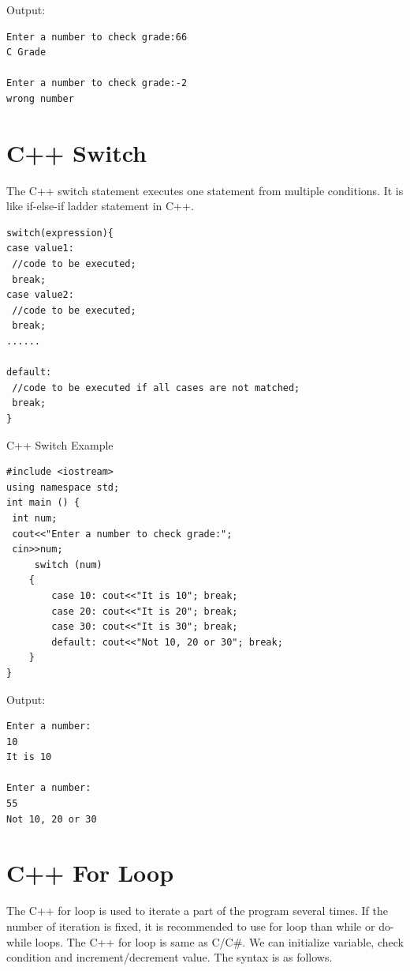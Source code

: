 \documentclass{book}
\begin{document}
Output:

\begin{lstlisting}
Enter a number to check grade:66
C Grade

Enter a number to check grade:-2
wrong number
\end{lstlisting}

\section{C++ Switch}

The C++ switch statement executes one statement from multiple conditions. It is like if-else-if ladder statement in C++.

\begin{lstlisting}
switch(expression){      
case value1:      
 //code to be executed;      
 break;    
case value2:      
 //code to be executed;      
 break;    
......      
      
default:       
 //code to be executed if all cases are not matched;      
 break;    
}    
\end{lstlisting}

C++ Switch Example

\begin{lstlisting}
#include <iostream>  
using namespace std;  
int main () {  
 int num;  
 cout<<"Enter a number to check grade:";    
 cin>>num;  
	 switch (num)    
	{    
		case 10: cout<<"It is 10"; break;    
		case 20: cout<<"It is 20"; break;    
		case 30: cout<<"It is 30"; break;    
		default: cout<<"Not 10, 20 or 30"; break;    
	}    
}    
\end{lstlisting}

Output:

\begin{lstlisting}
Enter a number:
10
It is 10

Enter a number:
55
Not 10, 20 or 30
\end{lstlisting}

\section{C++ For Loop}

The C++ for loop is used to iterate a part of the program several times. If the number of iteration is fixed, it is recommended to use for loop than while or do-while loops. The C++ for loop is same as C/C#. We can initialize variable, check condition and increment/decrement value. The syntax is as follows.
\end{document}
